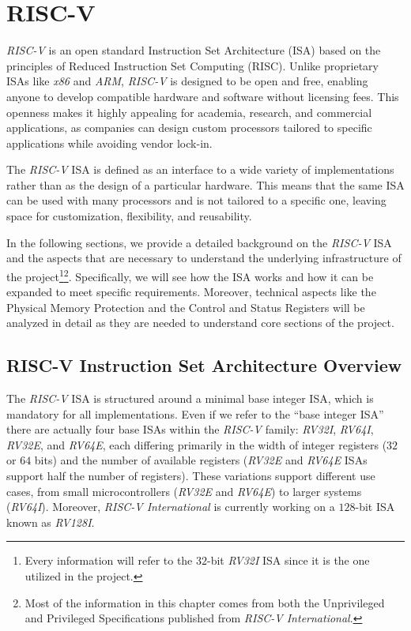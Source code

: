 \chapter{RISC-V}
\label{cha:riscv}

\textit{RISC-V} is an open standard Instruction Set Architecture (ISA) based on the
principles of Reduced Instruction Set Computing (RISC). Unlike proprietary ISAs
like \textit{x86} and \textit{ARM}, \textit{RISC-V} is designed to be open and
free, enabling anyone to develop compatible hardware and software without licensing
fees. This openness makes it highly appealing for academia, research, and
commercial applications, as companies can design custom processors tailored to specific
applications while avoiding vendor lock-in.

The \textit{RISC-V} ISA is defined as an interface to a wide variety of
implementations rather than as the design of a particular hardware. This means that
the same ISA can be used with many processors and is not tailored to a specific one,
leaving space for customization, flexibility, and reusability.

In the following sections, we provide a detailed background on the \textit{RISC-V}
ISA and the aspects that are necessary to understand the underlying
infrastructure of the project\footnote{Every information will refer to the $32$-bit
\textit{RV32I} ISA since it is the one utilized in the project.}\footnote{Most
of the information in this chapter comes from both the Unprivileged and
Privileged Specifications\cite{specifications} published from \textit{RISC-V
International}.}. Specifically, we will see how the ISA works and how it can be
expanded to meet specific requirements. Moreover, technical aspects like the
Physical Memory Protection and the Control and Status Registers will be analyzed
in detail as they are needed to understand core sections of the project.

\section{RISC-V Instruction Set Architecture Overview}
\label{sec:riscv_isa}

The \textit{RISC-V} ISA is structured around a minimal base integer ISA, which is
mandatory for all implementations. Even if we refer to the ``base integer ISA''
there are actually four base ISAs within the \textit{RISC-V} family: \textit{RV32I},
\textit{RV64I}, \textit{RV32E}, and \textit{RV64E}, each differing primarily in
the width of integer registers ($32$ or $64$ bits) and the number of available
registers (\textit{RV32E} and \textit{RV64E} ISAs support half the number of registers).
These variations support different use cases, from small microcontrollers (\textit{RV32E}
and \textit{RV64E}) to larger systems (\textit{RV64I}). Moreover, \textit{RISC-V
International} is currently working on a $128$-bit ISA known as \textit{RV128I}.

